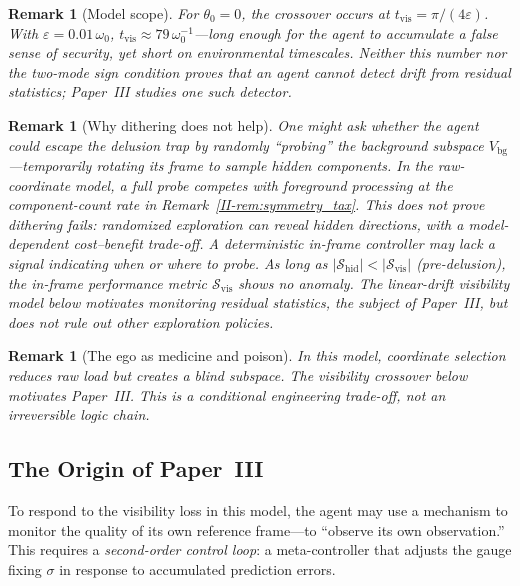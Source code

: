 \documentclass[12pt,a4paper,openany]{book}
\newtheorem{remark}[theorem]{Remark}
\begin{document}
\begin{remark}[Model scope]
\label{II-rem:linear_drift}
For $\theta_0=0$, the crossover occurs at
$t_{\mathrm{vis}} = \pi/(4\varepsilon)$.
With $\varepsilon = 0.01\,\omega_0$,
$t_{\mathrm{vis}} \approx 79\,\omega_0^{-1}$---long
enough for the agent to accumulate a false sense of
security, yet short on environmental timescales.
Neither this number nor the two-mode sign condition proves that an
agent cannot detect drift from residual statistics; Paper~III studies
one such detector.
\end{remark}

\begin{remark}[Why dithering does not help]
\label{II-rem:dithering}
One might ask whether the agent could escape the delusion
trap by randomly ``probing'' the background subspace
$V_{\mathrm{bg}}$---temporarily rotating its frame to
sample hidden components.
In the raw-coordinate model, a full probe competes with foreground
processing at the component-count rate in
Remark~\ref{II-rem:symmetry_tax}.  This does not prove dithering fails:
randomized exploration can reveal hidden directions, with a
model-dependent cost--benefit trade-off.  A deterministic in-frame
controller may lack a signal indicating when or where to probe.
As long as $|\mathcal{S}_{\mathrm{hid}}|
< |\mathcal{S}_{\mathrm{vis}}|$ (pre-delusion), the
in-frame performance metric $\mathcal{S}_{\mathrm{vis}}$
shows no anomaly.
The linear-drift visibility model below motivates monitoring residual
statistics, the subject of Paper~III, but does not rule out other
exploration policies.
\end{remark}

\begin{remark}[The ego as medicine and poison]
\label{II-rem:medicine_poison}
In this model, coordinate selection reduces raw load but creates a blind
subspace.  The visibility crossover below motivates Paper~III.  This is
a conditional engineering trade-off, not an irreversible logic chain.
\end{remark}

\subsection{The Origin of Paper~III}
\label{II-subsec:paper3}

To respond to the visibility loss in this model, the agent may use a mechanism
to monitor the quality of its own reference frame---to
``observe its own observation.''
This requires a \emph{second-order control loop}: a
meta-controller that adjusts the gauge fixing $\sigma$ in
response to accumulated prediction errors.
\end{document}
